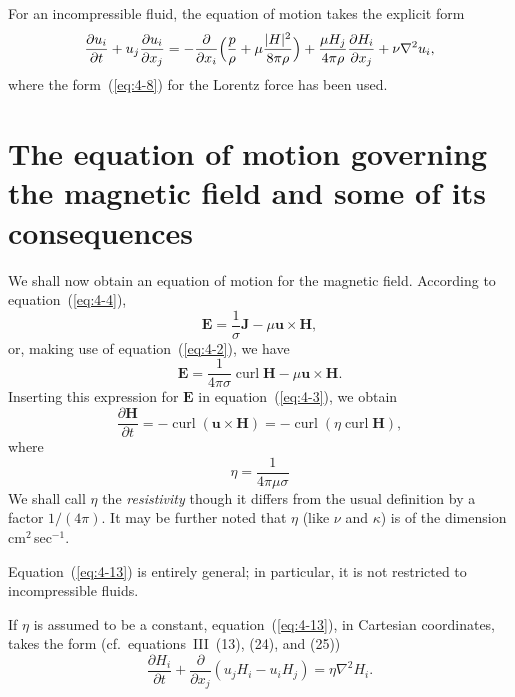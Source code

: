 For an incompressible fluid, the equation of motion takes the explicit form
\begin{equation}
\label{eq:4-10}
\frac{\partial u_i}{\partial t}+u_j\frac{\partial u_i}{\partial x_j} = -\frac{\partial}{\partial x_i}\Bigl(\frac{p}{\rho}+\mu\frac{|\mathbf{H}|^2}{8\pi\rho}\Bigr)+\frac{\mu H_j}{4\pi\rho}\frac{\partial H_i}{\partial x_j}+\nu\nabla^2 u_i,
\end{equation}
where the form~(\ref{eq:4-8}) for the Lorentz force has been used.

\section{The equation of motion governing the magnetic field and some of its consequences}\label{sec:38}

We shall now obtain an equation of motion for the magnetic field. According to equation~(\ref{eq:4-4}),
\begin{equation}
\label{eq:4-11}
\mathbf{E} = \frac{1}{\sigma}\mathbf{J}-\mu\mathbf{u}\times\mathbf{H},
\end{equation}
or, making use of equation~(\ref{eq:4-2}), we have
\begin{equation}
\label{eq:4-12}
\mathbf{E} = \frac{1}{4\pi\sigma}\operatorname{curl}\mathbf{H}-\mu\mathbf{u}\times\mathbf{H}.
\end{equation}
Inserting this expression for $\mathbf{E}$ in equation~(\ref{eq:4-3}), we obtain
\begin{equation}
\label{eq:4-13}
\frac{\partial\mathbf{H}}{\partial t} = -\operatorname{curl}(\mathbf{u}\times\mathbf{H}) = -\operatorname{curl}(\eta\operatorname{curl}\mathbf{H}),
\end{equation}
where
\begin{equation}
\label{eq:4-14}
\eta = \frac{1}{4\pi\mu\sigma}
\end{equation}
We shall call $\eta$ the \emph{resistivity} though it differs from the usual definition by a factor $1/(4\pi)$. It may be further noted that $\eta$ (like $\nu$ and $\kappa$) is of the dimension cm$^2$\,sec$^{-1}$.

Equation~(\ref{eq:4-13}) is entirely general; in particular, it is not restricted to incompressible fluids.

If $\eta$ is assumed to be a constant, equation~(\ref{eq:4-13}), in Cartesian coordinates, takes the form (cf.\ equations~III~(13), (24), and (25))
\begin{equation}
\label{eq:4-15}
\frac{\partial H_i}{\partial t}+\frac{\partial}{\partial x_j}(u_j H_i - u_i H_j) = \eta\nabla^2 H_i.
\end{equation}

